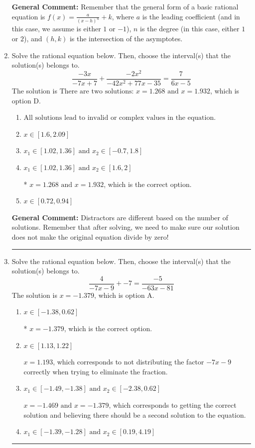 \documentclass{extbook}[14pt]
\newcommand{\litem}[1]{\item #1

\rule{\textwidth}{0.4pt}}
\begin{document}
\begin{enumerate}
{\textbf{General Comment:} Remember that the general form of a basic rational equation is $ f(x) = \frac{a}{(x-h)^n} + k$, where $a$ is the leading coefficient (and in this case, we assume is either $1$ or $-1$), $n$ is the degree (in this case, either $1$ or $2$), and $(h, k)$ is the intersection of the asymptotes.
}
\litem{
Solve the rational equation below. Then, choose the interval(s) that the solution(s) belongs to.
\[ \frac{-3x}{-7x + 7} + \frac{-2x^{2}}{-42x^{2} +77 x -35} = \frac{7}{6x -5} \]
The solution is \( \text{There are two solutions: } x = 1.268 \text{ and } x = 1.932 \), which is option D.\begin{enumerate}[label=\Alph*.]
\item \( \text{All solutions lead to invalid or complex values in the equation.} \)


\item \( x \in [1.6,2.09] \)


\item \( x_1 \in [1.02, 1.36] \text{ and } x_2 \in [-0.7,1.8] \)


\item \( x_1 \in [1.02, 1.36] \text{ and } x_2 \in [1.6,2] \)

* $x = 1.268 \text{ and } x = 1.932$, which is the correct option.
\item \( x \in [0.72,0.94] \)


\end{enumerate}

\textbf{General Comment:} Distractors are different based on the number of solutions. Remember that after solving, we need to make sure our solution does not make the original equation divide by zero!
}
\litem{
Solve the rational equation below. Then, choose the interval(s) that the solution(s) belongs to.
\[ \frac{4}{-7x -9} + -7 = \frac{-5}{-63x -81} \]
The solution is \( x = -1.379 \), which is option A.\begin{enumerate}[label=\Alph*.]
\item \( x \in [-1.38,0.62] \)

* $x = -1.379$, which is the correct option.
\item \( x \in [1.13,1.22] \)

$x = 1.193$, which corresponds to not distributing the factor $-7x -9$ correctly when trying to eliminate the fraction.
\item \( x_1 \in [-1.49, -1.38] \text{ and } x_2 \in [-2.38,0.62] \)

$x = -1.469 \text{ and } x = -1.379$, which corresponds to getting the correct solution and believing there should be a second solution to the equation.
\item \( x_1 \in [-1.39, -1.28] \text{ and } x_2 \in [0.19,4.19] \)


\end{enumerate}}
\end{enumerate}
\end{document}
